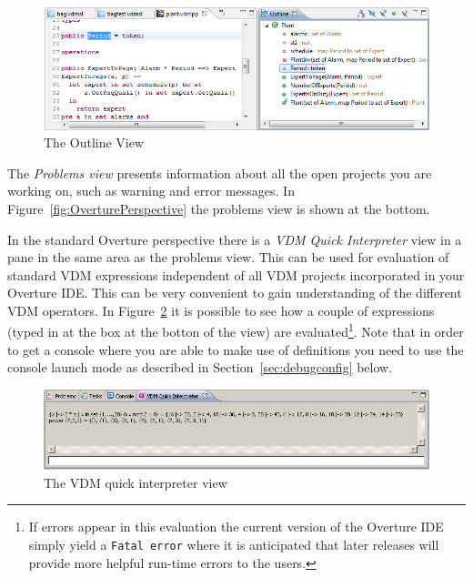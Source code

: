 \begin{figure}[!htb]
\begin{center}
  \includegraphics[width=4.5in]{figures/OutlineView}
  \caption[labelInTOC]{The Outline View}
  \label{fig:OutlineView}
\end{center}
\end{figure}

The \emph{Problems view} presents information about all the open projects you
are working on, such as warning and error messages. In
Figure~\ref{fig:OverturePerspective} the problems view is shown at the bottom.

In the standard Overture perspective there is a \emph{VDM Quick
  Interpreter} view in a pane in the same area as the problems
view. This can be used for evaluation of standard VDM expressions
independent of all VDM projects incorporated in your Overture
IDE. This can be very convenient to gain understanding of the
different VDM operators. In Figure~\ref{fig:QuickIntView} it is
possible to see how a couple of expressions (typed in at the box at
the botton of the view) are evaluated\footnote{If errors appear in
  this evaluation the current version of the Overture IDE simply yield
  a \texttt{Fatal error} where it is anticipated that later releases
  will provide more helpful run-time errors to the users.}. Note that
in order to get a console where you are able to make use of
definitions you need to use the console launch mode as described in
Section~\ref{sec:debugconfig} below.

\begin{figure}[!htb]
\begin{center}
  \includegraphics[width=4.5in]{figures/quickinterpreter}
  \caption[labelInTOC]{The VDM quick interpreter view}
  \label{fig:QuickIntView}
\end{center}
\end{figure}

